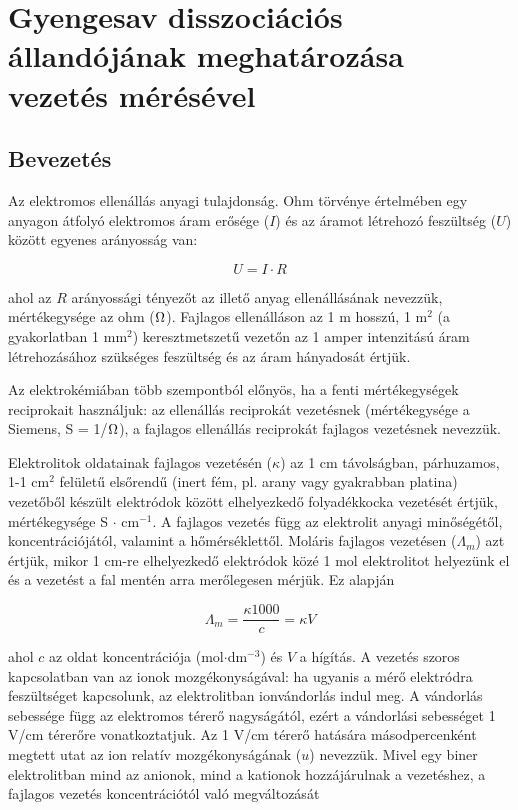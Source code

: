 \fancyhead[LO,RE]{\thesection}
\fancyfoot[LE,RO]{\thepage}

\setcounter{section}{7}
\section{Gyengesav disszociációs állandójának meghatározása vezetés mérésével}
\subsection{Bevezetés}
Az elektromos ellenállás anyagi tulajdonság.
Ohm törvénye értelmében egy anyagon átfolyó elektromos áram erősége ($I$) és az áramot létrehozó feszültség ($U$) között egyenes arányosság van:

\begin{equation}
\label{eq:ohm}
	U
	=
	I
	\cdot
	R
\end{equation}

ahol az $R$ arányossági tényezőt az illető anyag ellenállásának nevezzük, mértékegysége az ohm ($\ohm$).
Fajlagos ellenálláson az 1 m hosszú, 1 m$^2$ (a gyakorlatban 1 mm$^2$) keresztmetszetű vezetőn az 1 amper intenzitású áram létrehozásához szükséges feszültség és az áram hányadosát értjük.

Az elektrokémiában több szempontból előnyös, ha a fenti mértékegységek reciprokait használjuk: az ellenállás reciprokát vezetésnek (mértékegysége a Siemens, S = 1/$\ohm$), a fajlagos ellenállás reciprokát fajlagos vezetésnek nevezzük.

Elektrolitok oldatainak fajlagos vezetésén ($\kappa$) az 1 cm távolságban, párhuzamos, 1-1 cm$^2$ felületű elsőrendű (inert fém, pl. arany vagy gyakrabban platina) vezetőből készült elektródok között elhelyezkedő folyadékkocka vezetését értjük, mértékegysége S $\cdot$ cm$^{-1}$.
A fajlagos vezetés függ az elektrolit anyagi minőségétől, koncentrációjától, valamint a hőmérséklettől.
Moláris fajlagos vezetésen ($\Lambda _m$) azt értjük, mikor 1 cm-re elhelyezkedő elektródok közé 1 mol elektrolitot helyezünk el és a vezetést a fal mentén arra merőlegesen mérjük.
Ez alapján

\begin{equation}
\label{eq:lambdam}
        \Lambda_m
        =
        \frac
		{\kappa 1000 }
		{c}
	=
	\kappa V
\end{equation}

ahol $c$ az oldat koncentrációja (mol$\cdot$dm$^{-3}$) és $V$ a hígítás.
A vezetés szoros kapcsolatban van az ionok mozgékonyságával: ha ugyanis a mérő elektródra feszültséget kapcsolunk, az elektrolitban ionvándorlás indul meg.
A vándorlás sebessége függ az elektromos térerő nagyságától, ezért a vándorlási sebességet 1 V/cm térerőre vonatkoztatjuk.
Az 1 V/cm térerő hatására másodpercenként megtett utat az ion relatív mozgékonyságának ($u$) nevezzük.
Mivel egy biner elektrolitban mind az anionok, mind a kationok hozzájárulnak a vezetéshez, a fajlagos vezetés koncentrációtól való megváltozását

